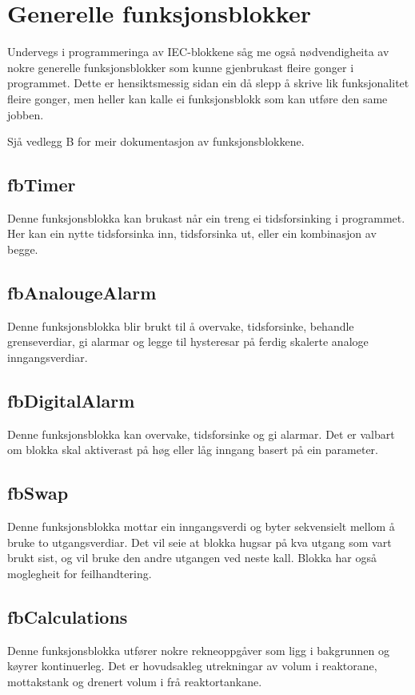 \section{Generelle funksjonsblokker}
\thispagestyle{fancy}

Undervegs i programmeringa av \gls{IEC}-blokkene såg me også nødvendigheita av nokre generelle funksjonsblokker
som kunne gjenbrukast fleire gonger i programmet. Dette er hensiktsmessig sidan ein då slepp å skrive lik 
funksjonalitet fleire gonger, men heller kan kalle ei funksjonsblokk som kan utføre den same jobben.

Sjå vedlegg B for meir dokumentasjon av funksjonsblokkene.

\subsection{fbTimer}
Denne funksjonsblokka kan brukast når ein treng ei tidsforsinking i programmet.
Her kan ein nytte tidsforsinka inn, tidsforsinka ut, eller ein kombinasjon av begge.

\subsection{fbAnalougeAlarm}
Denne funksjonsblokka blir brukt til å overvake, tidsforsinke, behandle grenseverdiar, 
gi alarmar og legge til hysteresar på ferdig skalerte analoge inngangsverdiar.

\subsection{fbDigitalAlarm}
Denne funksjonsblokka kan overvake, tidsforsinke og gi alarmar. Det er valbart om blokka skal aktiverast på høg eller låg
inngang basert på ein parameter.

\subsection{fbSwap}\label{sec:1}
Denne funksjonsblokka mottar ein inngangsverdi og byter sekvensielt mellom å bruke to utgangsverdiar. Det vil seie at blokka hugsar på kva utgang som vart brukt sist,
og vil bruke den andre utgangen ved neste kall. Blokka har også moglegheit for feilhandtering.

\subsection{fbCalculations}
Denne funksjonsblokka utfører nokre rekneoppgåver som ligg i bakgrunnen og køyrer kontinuerleg. 
Det er hovudsakleg utrekningar av volum i reaktorane, mottakstank og drenert volum i frå reaktortankane.

